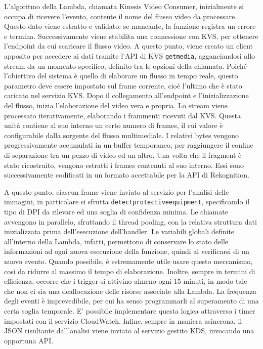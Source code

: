 L'algoritmo della Lambda, chiamata Kinesis Video Consumer, inizialmente si occupa di ricevere l'evento, contente il nome del flusso video da processare. Questo dato viene estratto e validato: se mancante, la funzione registra un errore e termina. Successivamente viene stabilita una connessione con KVS, per ottenere l'endpoint da cui scaricare il flusso video. A questo punto, viene creato un client apposito per accedere ai dati tramite l'API di KVS \texttt{get\textunderscore media}, agganciandosi allo stream da un momento specifico, definito tra le opzioni della chiamata. Poiché l'obiettivo del sistema è quello di elaborare un flusso in tempo reale, questo parametro deve essere impostato sul frame corrente, cioè l'ultimo che è stato caricato nel servizio KVS. Dopo il collegamento all'endpoint e l'inizializzazione del flusso, inizia l'elaborazione del video vera e propria. Lo stream viene processato iterativamente, elaborando i frammenti ricevuti dal KVS. %
Questa unità contiene al suo interno un certo numero di frames, il cui valore è configurabile dalla sorgente del flusso multimediale. %
I relativi bytes vengono progressivamente accumulati in un buffer temporaneo, per raggiungere il confine di separazione tra un pezzo di video ed un altro. Una volta che il fragment è stato ricostruito, vengono estratti i frames contenuti al suo interno. Essi sono successivamente codificati in un formato accettabile per la API di Rekognition. 

A questo punto, ciascun frame viene inviato al servizio per l'analisi delle immagini, in particolare si sfrutta \sloppy\texttt{detect\textunderscore protective\textunderscore equipment}\fussy, specificando il tipo di DPI da rilevare ed una soglia di confidenza minima. Le chiamate avvengono in parallelo, sfruttando il thread pooling, con la relativa struttura dati inizializzata prima dell'esecuzione dell'handler. Le variabili globali definite all'interno della Lambda, infatti, permettono di conservare lo stato delle informazioni ad ogni nuova esecuzione della funzione, quindi al verificarsi di un nuovo evento. Quando possibile, è estremamente utile usare questo meccanismo, così da ridurre al massimo il tempo di elaborazione. Inoltre, sempre in termini di efficienza, occorre che i trigger si attivino almeno ogni 15 minuti, in modo tale che non ci sia una deallocazione delle risorse associate alla Lambda. La frequenza degli eventi è imprevedibile, per cui ha senso programmarli al superamento di una certa soglia temporale. E' possibile implementare questa logica attraverso i timer impostati con il servizio CloudWatch. Infine, sempre in maniera asincrona, il JSON risultante dall'analisi viene inviato al servizio gestito KDS, invocando una opportuna API.




